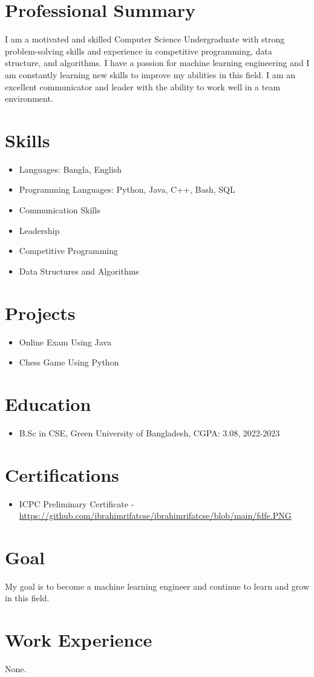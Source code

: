 \documentclass[11pt,a4paper,sans]{moderncv}
\begin{document}
\makecvtitle

\section{Professional Summary}
I am a motivated and skilled Computer Science Undergraduate with strong problem-solving skills and experience in competitive programming, data structure, and algorithms. I have a passion for machine learning engineering and I am constantly learning new skills to improve my abilities in this field. I am an excellent communicator and leader with the ability to work well in a team environment.

\section{Skills}
\begin{itemize}
\item Languages: Bangla, English
\item Programming Languages: Python, Java, C++, Bash, SQL
\item Communication Skills
\item Leadership
\item Competitive Programming
\item Data Structures and Algorithms
\end{itemize}

\section{Projects}
\begin{itemize}
\item Online Exam Using Java
\item Chess Game Using Python
\end{itemize}

\section{Education}
\begin{itemize}
\item B.Sc in CSE, Green University of Bangladesh, CGPA: 3.08, 2022-2023
\end{itemize}

\section{Certifications}
\begin{itemize}
\item ICPC Preliminary Certificate - \url{https://github.com/ibrahimrifatcse/ibrahimrifatcse/blob/main/fdfe.PNG}
\end{itemize}

\section{Goal}
My goal is to become a machine learning engineer and continue to learn and grow in this field.

\section{Work Experience}
None.
\end{document}
